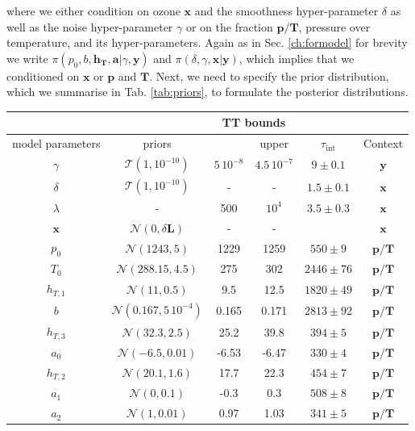 where we either condition on ozone $\bm{x}$ and the smoothness hyper-parameter $\delta$ as well as the noise hyper-parameter $\gamma$ or on the fraction $\bm{p}/\bm{T}$, pressure over temperature, and its hyper-parameters.
Again as in Sec. \ref{ch:formodel} for brevity we write $\pi(p_0,b,\bm{h_T},\bm{a}| \gamma,\bm{y}) $ and $\pi(\delta, \gamma, \bm{x}|\bm{y})$, which implies that we conditioned on $\bm{x}$ or $\bm{p}$ and $\bm{T}$. 
Next, we need to specify the prior distribution, which we summarise in Tab. \ref{tab:priors}, to formulate the posterior distributions.
\begin{table}
	\centering
	\begin{tabular}{ |c||c|c|c|c|c|   }
		\hline
		& &\multicolumn{2}{|c|}{TT bounds}& &\\
		\hline
		model parameters& priors&\makecell{lower}& \makecell{upper\\
		}&$\tau_{\text{int}}$&Context\\
		\hhline{|=||=|=|=|=|=|}
		$\gamma$ & $\mathcal{T}(1,10^{-10})$ &$5 \, 10^{-8}$ &$4.5 \, 10^{-7}$&  $ 9\pm 0.1$ &$\bm{y}$\\ \hline
		$\delta$ &$\mathcal{T}(1,10^{-10})$ & -&-& $1.5 \pm 0.1$ & $\bm{x}$\\ \hline
		$\lambda$ &- & 500&$10^4$& $3.5 \pm 0.3$ &$\bm{x}$\\ \hline
		$\bm{x}$ &$\mathcal{N}(0,\delta \bm{L})$ & -&-&& $\bm{x}$\\ \hhline{|=||=|=|=|=|=|}
		$p_0$ &  $\mathcal{N}(1243,5)$&1229 &1259&$550 \pm 9$&$\bm{p/T}$\\ \hline
		$T_{0}$ &  $\mathcal{N}(288.15,4.5)$& 275 &302&$2446 \pm 76$&$\bm{p/T}$\\ \hline
		$h_{T,1}$ &  $\mathcal{N}(11,0.5)$&9.5 &12.5&$1820 \pm 49$ &$\bm{p/T}$\\ \hline
		$b$ &  $\mathcal{N}(0.167,5\,10^{-4})$& 0.165& 0.171 &$2813 \pm 92$&$\bm{p/T}$\\ \hline
		$h_{T,3}$ &  $\mathcal{N}(32.3,2.5)$&25.2&39.8&$394 \pm 5$&$\bm{p/T}$\\ \hline
		$a_{0}$ &  $\mathcal{N}(-6.5,0.01)$&-6.53 &-6.47&$330 \pm 4$&$\bm{p/T}$\\ \hline
		$h_{T,2}$ &  $\mathcal{N}(20.1,1.6)$&17.7 &22.3&$454 \pm 7$&$\bm{p/T}$\\ \hline
		$a_{1}$ &  $\mathcal{N}(0,0.1)$&-0.3 &0.3&$508 \pm 8$&$\bm{p/T}$\\ \hline
		$a_{2}$ &  $\mathcal{N}(1,0.01)$&0.97 &1.03&$341 \pm 5$&$\bm{p/T}$\\ \hline

\end{tabular}
\end{table}
